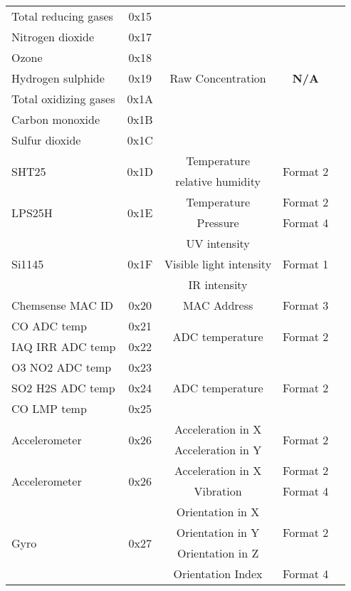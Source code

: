 \begin{landscape}
\begin{longtable}{l|c|c|c|c}
\rowcolor{black!8} \multicolumn{5}{c}{{Chemsense board}} \\ \hline
    Total reducing gases & 0x15 & \multirow{7}{*}{Raw Concentration} & \multirow{7}{*}{\bf{N/A}} & \\ \cline{1-2}
    Nitrogen dioxide & 0x17 & & & \\ \cline{1-2}
    Ozone & 0x18 & & \\ \cline{1-2}
    Hydrogen sulphide & 0x19 & & & \\ \cline{1-2}
    Total oxidizing gases & 0x1A & & & \\ \cline{1-2}
    Carbon monoxide & 0x1B & & & \\ \cline{1-2}
    Sulfur dioxide & 0x1C & & & \\ \hline
    \multirow{2}{*}{SHT25} & \multirow{2}{*}{0x1D} & Temperature & \multirow{2}{*}{Format 2} & \\ \cline{3-3}
    & & relative humidity & & \\ \hline
    \multirow{2}{*}{LPS25H} & \multirow{2}{*}{0x1E} & Temperature & Format 2 & \\ \cline{3-4}
    & & Pressure & Format 4 & \\ \hline
    \multirow{3}{*}{Si1145} & \multirow{3}{*}{0x1F} & UV intensity & \multirow{3}{*}{Format 1} & \\ \cline{3-3}
    & & Visible light intensity & & \\ \cline{3-3}
    & & IR intensity & & \\ \hline
    Chemsense MAC ID & 0x20 & MAC Address & Format 3 & \\ \hline
    CO ADC temp & 0x21 & \multirow{2}{*}{ADC temperature} &  \multirow{2}{*}{Format 2} & \\ \cline{1-2}
    IAQ IRR ADC temp & 0x22 & & & \\ \hline
    O3 NO2 ADC temp & 0x23 & \multirow{3}{*}{ADC temperature} &  \multirow{3}{*}{Format 2} & \\ \cline{1-2}
    SO2 H2S ADC temp & 0x24 & & & \\ \cline{1-2}
    CO LMP temp & 0x25 & & & \\ \hline 

    \multirow{2}{*}{Accelerometer} & \multirow{2}{*}{0x26} & Acceleration in X & \multirow{2}{*}{Format 2} & \\ \cline{3-3}
    & & Acceleration in Y & & \\ \hline
    \multirow{2}{*}{Accelerometer} & \multirow{2}{*}{0x26} & Acceleration in X & Format 2 & \\ \cline{3-4}
    & & Vibration & Format 4 & \\ \hline
    \multirow{4}{*}{Gyro} & \multirow{4}{*}{0x27} & Orientation in X & \multirow{3}{*}{Format 2} & \\ \cline{3-3}
    & & Orientation in Y & & \\ \cline{3-3}
    & & Orientation in Z & & \\ \cline {3-4}
    & & Orientation Index & Format 4 & \\ \hline


\end{longtable}
\end{landscape}
